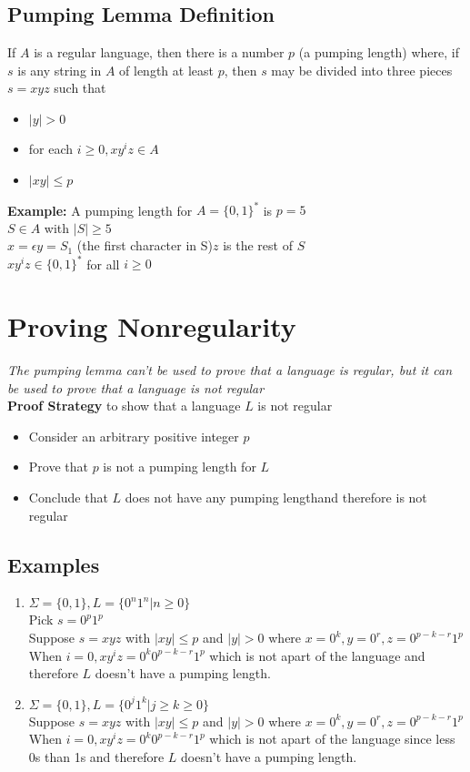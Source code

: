 \documentclass{article}
\begin{document}
\subsection{Pumping Lemma Definition}
If $A$ is a regular language, then there is a number $p$ (a pumping length) where, if $s$ is any string in $A$ of length at least $p$, then $s$ may be divided into three pieces $s=xyz$ such that
\begin{itemize}
    \item $\vert y\vert>0$
    \item for each $i\geq 0,xy^iz\in A$
    \item $\vert xy\vert\leq p$
\end{itemize}
\textbf{Example:} A pumping length for $A=\{0,1\}^*$ is $p=5$\\
$S\in A$ with $\vert S\vert\geq5$\\
$x=\epsilon$\hspace*{0.5in}$y=S_1$ (the first character in S)\hspace*{0.5in}$z$ is the rest of $S$\\
$xy^iz\in\{0,1\}^*$ for all $i\geq0$
\section{Proving Nonregularity}
\label{sec:proveNonregular}
\textit{The pumping lemma can't be used to prove that a language is regular, but it can be used to prove that a language is not regular}\\
\textbf{Proof Strategy} to show that a language $L$ is not regular
\begin{itemize}
    \item Consider an arbitrary positive integer $p$
    \item Prove that $p$ is not a pumping length for $L$
    \item Conclude that $L$ does not have any pumping lengthand therefore is not regular
\end{itemize}
\subsection{Examples}
\begin{enumerate}
    \item $\Sigma=\{0,1\},L=\{0^n1^n\vert n\geq0\}$\\
    Pick $s=0^p1^p$\\
    Suppose $s=xyz$ with $\vert xy\vert\leq p$ and $\vert y\vert>0$ where $x=0^k,y=0^r,z=0^{p-k-r}1^p$\\
    When $i=0,xy^iz=0^k0^{p-k-r}1^p$ which is not apart of the language and therefore $L$ doesn't have a pumping length.
    \item $\Sigma=\{0,1\},L=\{0^j1^k\vert j\geq k\geq0\}$\\
    Suppose $s=xyz$ with $\vert xy\vert\leq p$ and $\vert y\vert>0$ where $x=0^k,y=0^r,z=0^{p-k-r}1^p$\\
    When $i=0,xy^iz=0^k0^{p-k-r}1^p$ which is not apart of the language since less 0s than 1s and therefore $L$ doesn't have a pumping length.
\end{enumerate}
\end{document}
